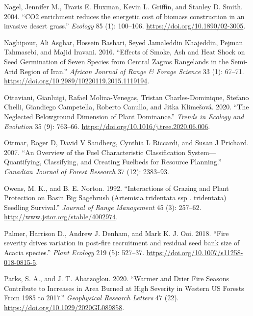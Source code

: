 \documentclass[
  12pt,
]{article}
\newlength{\cslhangindent}
\newlength{\cslentryspacingunit} %
\newenvironment{CSLReferences}[2] %
 {%
  \setlength{\parindent}{0pt}
  \ifodd #1
  \let\oldpar\par
  \def\par{\hangindent=\cslhangindent\oldpar}
  \fi
  \setlength{\parskip}{#2\cslentryspacingunit}
 }%
 {}
\begin{document}
\begin{CSLReferences}{1}{0}
\leavevmode{}%
Nagel, Jennifer M., Travis E. Huxman, Kevin L. Griffin, and Stanley D.
Smith. 2004. {``{CO2 enrichment reduces the energetic cost of biomass
construction in an invasive desert grass}.''} \emph{Ecology} 85 (1):
100--106. \url{https://doi.org/10.1890/02-3005}.

\leavevmode{}%
Naghipour, Ali Asghar, Hossein Bashari, Seyed Jamaleddin Khajeddin,
Pejman Tahmasebi, and Majid Iravani. 2016. {``Effects of Smoke, Ash and
Heat Shock on Seed Germination of Seven Species from {Central} {Zagros}
Rangelands in the Semi-Arid Region of {Iran}.''} \emph{African Journal
of Range \& Forage Science} 33 (1): 67--71.
\url{https://doi.org/10.2989/10220119.2015.1119194}.

\leavevmode{}%
Ottaviani, Gianluigi, Rafael Molina-Venegas, Tristan Charles-Dominique,
Stefano Chelli, Giandiego Campetella, Roberto Canullo, and Jitka
Klimešová. 2020. {``{The Neglected Belowground Dimension of Plant
Dominance}.''} \emph{Trends in Ecology and Evolution} 35 (9): 763--66.
\url{https://doi.org/10.1016/j.tree.2020.06.006}.

\leavevmode{}%
Ottmar, Roger D, David V Sandberg, Cynthia L Riccardi, and Susan J
Prichard. 2007. {``An Overview of the Fuel Characteristic Classification
System---Quantifying, Classifying, and Creating Fuelbeds for Resource
Planning.''} \emph{Canadian Journal of Forest Research} 37 (12):
2383--93.

\leavevmode{}%
Owens, M. K., and B. E. Norton. 1992. {``{Interactions of Grazing and
Plant Protection on Basin Big Sagebrush (Artemisia tridentata ssp .
tridentata) Seedling Survival}.''} \emph{Journal of Range Management} 45
(3): 257--62. \url{http://www.jstor.org/stable/4002974}.

\leavevmode{}%
Palmer, Harrison D., Andrew J. Denham, and Mark K. J. Ooi. 2018.
{``{Fire severity drives variation in post-fire recruitment and residual
seed bank size of Acacia species}.''} \emph{Plant Ecology} 219 (5):
527--37. \url{https://doi.org/10.1007/s11258-018-0815-5}.

\leavevmode{}%
Parks, S. A., and J. T. Abatzoglou. 2020. {``Warmer and {Drier} {Fire}
{Seasons} {Contribute} to {Increases} in {Area} {Burned} at {High}
{Severity} in {Western} {US} {Forests} {From} 1985 to 2017.''}
\emph{Geophysical Research Letters} 47 (22).
\url{https://doi.org/10.1029/2020GL089858}.


\end{CSLReferences}
\end{document}
